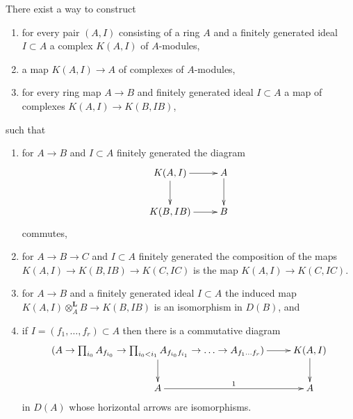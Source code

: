 \begin{lemma}
\label{lemma-all-rings}
There exist a way to construct
\begin{enumerate}
\item for every pair $(A, I)$ consisting of a ring $A$ and a finitely
generated ideal $I \subset A$ a complex $K(A, I)$ of $A$-modules,
\item a map $K(A, I) \to A$ of complexes of $A$-modules,
\item for every ring map $A \to B$ and finitely generated ideal $I \subset A$
a map of complexes $K(A, I) \to K(B, IB)$,
\end{enumerate}
such that
\begin{enumerate}
\item[(a)] for $A \to B$ and $I \subset A$ finitely generated the diagram
$$
\xymatrix{
K(A, I) \ar[r] \ar[d] & A \ar[d] \\
K(B, IB) \ar[r] & B
}
$$
commutes,
\item[(b)] for $A \to B \to C$ and $I \subset A$ finitely generated
the composition of the maps
$K(A, I) \to K(B, IB) \to K(C, IC)$ is the map $K(A, I) \to K(C, IC)$.
\item[(c)] for $A \to B$ and a finitely generated ideal $I \subset A$
the induced map $K(A, I) \otimes_A^\mathbf{L} B \to K(B, IB)$
is an isomorphism in $D(B)$, and
\item[(d)] if $I = (f_1, \ldots, f_r) \subset A$ then there is a commutative
diagram
$$
\xymatrix{
(A \to \prod\nolimits_{i_0} A_{f_{i_0}} \to
\prod\nolimits_{i_0 < i_1} A_{f_{i_0}f_{i_1}} \to
\ldots \to A_{f_1\ldots f_r}) \ar[r] \ar[d] &  K(A, I) \ar[d] \\
A \ar[r]^1 & A
}
$$
in $D(A)$ whose horizontal arrows are isomorphisms.
\end{enumerate}
\end{lemma}


